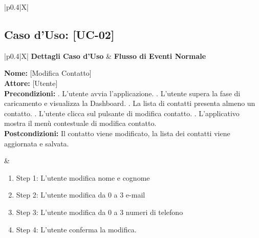 \documentclass[a4paper,12pt]{article}
\begin{document}
\begin{table}[htbp]
\begin{tabularx}{\textwidth}{|p{0.4\textwidth}|X|}
{            } \\
            \hline
        \end{tabularx}
        \caption{Aggiunta Contatto}
    \end{table}
    \newpage
    \subsection{Caso d'Uso: [UC-02]}

    \begin{table}[htbp]
        \centering
        \begin{tabularx}{\textwidth}{|p{0.4\textwidth}|X|}
            \hline
            \textbf{Dettagli Caso d'Uso} & \textbf{Flusso di Eventi Normale} \\
            \hline
            \parbox[t]{0.38\textwidth}{%
                \textbf{Nome:} [Modifica Contatto] \\[1ex]
                \textbf{Attore:} [Utente] \\[1ex]
                \textbf{Precondizioni:} . L'utente avvia l'applicazione. . L'utente supera la fase di caricamento e visualizza la Dashboard. . La lista di contatti presenta almeno un contatto.  . L'utente clicca sul pulsante di modifica contatto. . L'applicativo mostra il menù contestuale di modifica contatto. \\[1ex]
                \textbf{Postcondizioni:} \newline Il contatto viene modificato, la lista dei contatti viene aggiornata e salvata.\newline
            }
            &
            \parbox[t]{\linewidth}{%
                \begin{enumerate}[noitemsep, leftmargin=*]
                    \item Step 1: L'utente modifica nome e cognome
                    \item Step 2: L'utente modifica da 0 a 3 e-mail
                    \item Step 3: L'utente modifica da 0 a 3 numeri di telefono
                    \item Step 4: L'utente conferma la modifica.
                \end{enumerate}
            } \\
            \hline
\end{tabularx}
\end{table}
\end{document}
